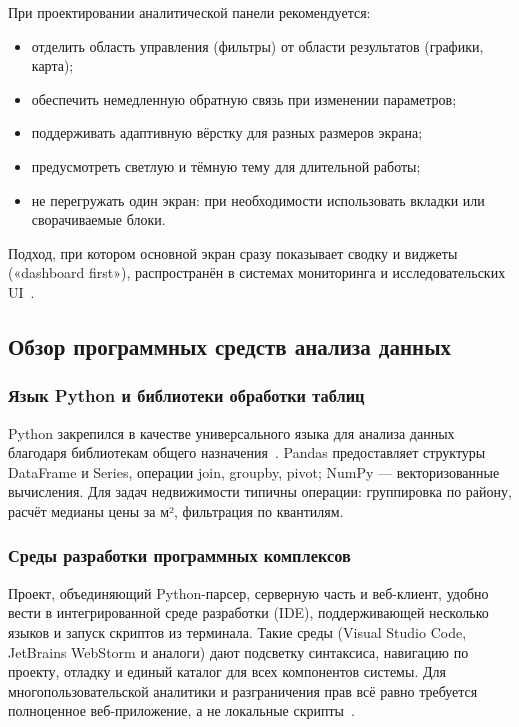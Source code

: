 При проектировании аналитической панели рекомендуется:
\begin{itemize}
    \item отделить область управления (фильтры) от области результатов (графики, карта);
    \item обеспечить немедленную обратную связь при изменении параметров;
    \item поддерживать адаптивную вёрстку для разных размеров экрана;
    \item предусмотреть светлую и тёмную тему для длительной работы;
    \item не перегружать один экран: при необходимости использовать вкладки или сворачиваемые блоки.
\end{itemize}
Подход, при котором основной экран сразу показывает сводку и виджеты («dashboard first»), распространён в системах мониторинга и исследовательских UI~\cite{filimonova2024}.

\subsection{Обзор программных средств анализа данных}

\subsubsection{Язык Python и библиотеки обработки таблиц}

Python закрепился в качестве универсального языка для анализа данных благодаря библиотекам общего назначения~\cite{habr-bigdata,w3schools-numpy}. Pandas предоставляет структуры DataFrame и Series, операции join, groupby, pivot; NumPy --- векторизованные вычисления. Для задач недвижимости типичны операции: группировка по району, расчёт медианы цены за м², фильтрация по квантилям.

\subsubsection{Среды разработки программных комплексов}

Проект, объединяющий Python-парсер, серверную часть и веб-клиент, удобно вести в интегрированной среде разработки (IDE), поддерживающей несколько языков и запуск скриптов из терминала. Такие среды (Visual Studio Code, JetBrains WebStorm и аналоги) дают подсветку синтаксиса, навигацию по проекту, отладку и единый каталог для всех компонентов системы. Для многопользовательской аналитики и разграничения прав всё равно требуется полноценное веб-приложение, а не локальные скрипты~\cite{ahtimirov2024}.

